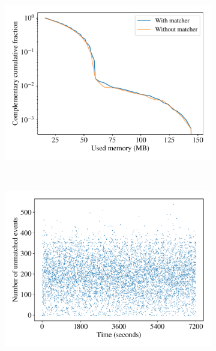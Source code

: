 \begin{figure}[t!]
\begin{subfigure}[t]{0.33\textwidth}
        \centering
        \includegraphics[width=1.0\textwidth]{figures/diffstream/memory_ccdf.pdf}
        \caption{}\label{diffstream:fig:memory-ccdf}
    \end{subfigure}%
    \\
    \begin{subfigure}[t]{0.33\textwidth}
        \centering
        \includegraphics[width=1.0\textwidth]{figures/diffstream/unmatched_in_time.pdf}
        \caption{}\label{diffstream:fig:unmatched-in-time}
    \end{subfigure}%
    \begin{subfigure}[t]{0.33\textwidth}
        \centering

\end{subfigure}
\end{figure}
